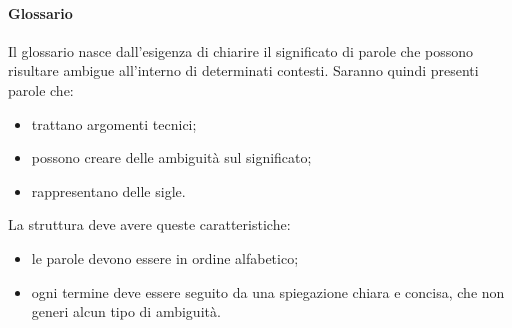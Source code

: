  \paragraph{Glossario}
Il glossario nasce dall'esigenza di chiarire il significato di parole che possono risultare ambigue all'interno di determinati contesti. Saranno quindi presenti parole che:
\begin{itemize}
	\item trattano argomenti tecnici;
	\item possono creare delle ambiguità sul significato;
	\item rappresentano delle sigle.
\end{itemize}
La struttura deve avere queste caratteristiche:
\begin{itemize}
	\item le parole devono essere in ordine alfabetico;
	\item ogni termine deve essere seguito da una spiegazione chiara e concisa, che non generi alcun tipo di ambiguità.
\end{itemize}

